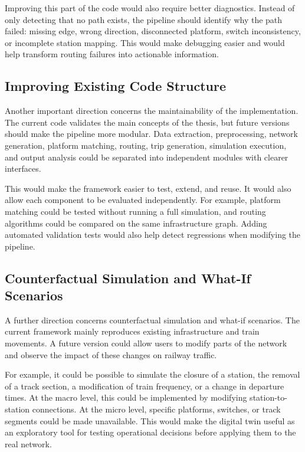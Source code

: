 Improving this part of the code would also require better diagnostics. Instead of only detecting that no path exists, the 
pipeline should identify why the path failed: missing edge, wrong direction, disconnected platform, switch inconsistency, 
or incomplete station mapping. This would make debugging easier and would help transform routing failures into actionable 
information.

\subsection{Improving Existing Code Structure}
Another important direction concerns the maintainability of the implementation. The current code validates the main 
concepts of the thesis, but future versions should make the pipeline more modular. Data extraction, preprocessing, network 
generation, platform matching, routing, trip generation, simulation execution, and output analysis could be separated into 
independent modules with clearer interfaces.

This would make the framework easier to test, extend, and reuse. It would also allow each component to be evaluated 
independently. For example, platform matching could be tested without running a full simulation, and routing algorithms 
could be compared on the same infrastructure graph. Adding automated validation tests would also help detect regressions 
when modifying the pipeline.

\newpage

\subsection{Counterfactual Simulation and What-If Scenarios}
A further direction concerns counterfactual simulation and what-if scenarios. The current framework mainly reproduces 
existing infrastructure and train movements. A future version could allow users to modify parts of the network and observe 
the impact of these changes on railway traffic.

For example, it could be possible to simulate the closure of a station, the removal of a track section, a modification of 
train frequency, or a change in departure times. At the macro level, this could be implemented by modifying 
station-to-station connections. At the micro level, specific platforms, switches, or track segments could be made 
unavailable. This would make the digital twin useful as an exploratory tool for testing operational decisions before 
applying them to the real network.

